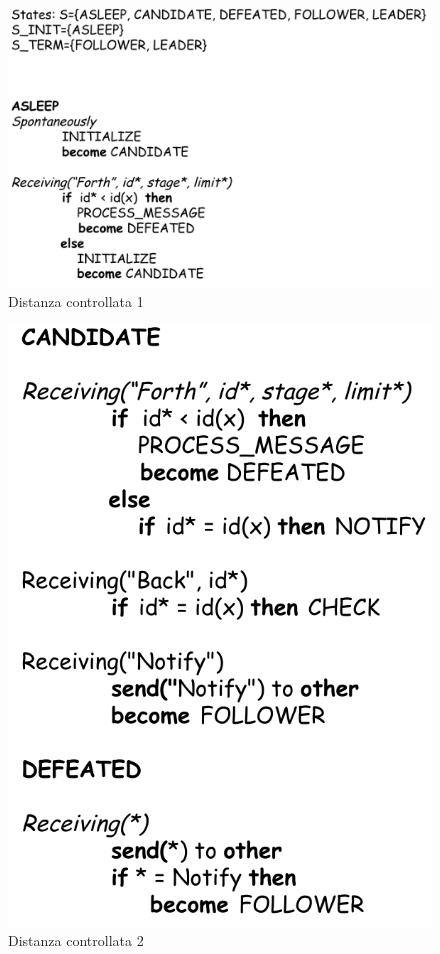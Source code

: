 \documentclass[12pt]{article}
\begin{document}
			\begin{figure}[h!]
				\centering
				\includegraphics[scale=0.30]{img/con1.png}
				\caption{Distanza controllata 1}
			\end{figure}
			\begin{figure}[h!]
				\centering
				\includegraphics[scale=0.30]{img/con2.png}
				\caption{Distanza controllata 2}
			\end{figure}
\end{document}
